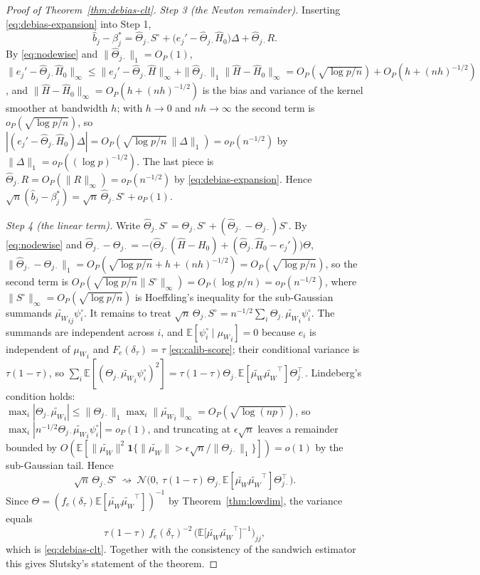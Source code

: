 \documentclass[12pt,a4paper]{article}
\theoremstyle{definition}
\theoremstyle{remark}
\newcommand{\E}{\mathbb{E}}
\newcommand{\cN}{\mathcal{N}}
\newcommand{\ind}[1]{\mathbf{1}\{#1\}}
\newcommand{\muv}{\mu_W}
\begin{document}
\begin{proof}[Proof of Theorem~\ref{thm:debias-clt}]
\emph{Step 3 (the Newton remainder).} Inserting \eqref{eq:debias-expansion} into Step 1,
\[
\hat b_j-\beta^*_j
=\hat\Theta_{j\cdot}S^\circ+\big(e_j'-\hat\Theta_{j\cdot}\hat H_0\big)\Delta
+\hat\Theta_{j\cdot}R .
\]
By \eqref{eq:nodewise} and $\|\hat\Theta_{j\cdot}\|_1=O_P(1)$,
$\|e_j'-\hat\Theta_{j\cdot}\hat H_0\|_\infty\le\|e_j'-\hat\Theta_{j\cdot}\hat H\|_\infty
+\|\hat\Theta_{j\cdot}\|_1\|\hat H-\hat H_0\|_\infty
=O_P(\sqrt{\log p/n})+O_P(h+(nh)^{-1/2})$, and
$\|\hat H-\hat H_0\|_\infty=O_P(h+(nh)^{-1/2})$ is the bias and variance of the kernel
smoother at bandwidth $h$; with $h\to0$ and $nh\to\infty$ the second term is
$o_P(\sqrt{\log p/n})$, so
$|(e_j'-\hat\Theta_{j\cdot}\hat H_0)\Delta|=O_P(\sqrt{\log p/n}\,\|\Delta\|_1)
=o_P(n^{-1/2})$ by $\|\Delta\|_1=o_P((\log p)^{-1/2})$. The last piece is
$\hat\Theta_{j\cdot}R=O_P(\|R\|_\infty)=o_P(n^{-1/2})$ by \eqref{eq:debias-expansion}.
Hence
$\sqrt n(\hat b_j-\beta^*_j)=\sqrt n\,\hat\Theta_{j\cdot}S^\circ+o_P(1)$.

\emph{Step 4 (the linear term).} Write
$\hat\Theta_{j\cdot}S^\circ=\Theta_{j\cdot}S^\circ+(\hat\Theta_{j\cdot}-\Theta_{j\cdot})S^\circ$.
By \eqref{eq:nodewise} and $\hat\Theta_{j\cdot}-\Theta_{j\cdot}
=-\big(\hat\Theta_{j\cdot}(\hat H-H_0)+(\hat\Theta_{j\cdot}\hat H_0-e_j')\big)\Theta$,
$\|\hat\Theta_{j\cdot}-\Theta_{j\cdot}\|_1=O_P(\sqrt{\log p/n}+h+(nh)^{-1/2})
=O_P(\sqrt{\log p/n})$, so the second term is
$O_P(\sqrt{\log p/n}\|S^\circ\|_\infty)=O_P(\log p/n)=o_P(n^{-1/2})$, where
$\|S^\circ\|_\infty=O_P(\sqrt{\log p/n})$ is Hoeffding's inequality for the sub-Gaussian
summands ${\tilde{\muv}}_{ij}\psi_i^\circ$. It remains to treat
$\sqrt n\,\Theta_{j\cdot}S^\circ=n^{-1/2}\sum_i\Theta_{j\cdot}{\tilde{\muv}}_i\psi_i^\circ$.
The summands are independent across $i$, and
$\E[\psi_i^\circ\mid{\muv}_i]=0$ because $e_i$ is independent of ${\muv}_i$ and
$F_e(\delta_\tau)=\tau$ \eqref{eq:calib-score}; their conditional variance is
$\tau(1-\tau)$, so
$\sum_i\E[(\Theta_{j\cdot}{\tilde{\muv}}_i\psi_i^\circ)^2]
=\tau(1-\tau)\Theta_{j\cdot}\E[\tilde{\muv}{\tilde{\muv}}^\top]\Theta_{j\cdot}^\top$.
Lindeberg's condition holds: $\max_i|\Theta_{j\cdot}{\tilde{\muv}}_i|\le\|\Theta_{j\cdot}\|_1
\max_i\|{\tilde{\muv}}_i\|_\infty=O_P(\sqrt{\log(np)})$, so
$\max_i|n^{-1/2}\Theta_{j\cdot}{\tilde{\muv}}_i\psi_i^\circ|=o_P(1)$, and truncating at
$\epsilon\sqrt n$ leaves a remainder bounded by
$O(\E[\|\tilde{\muv}\|^2\ind{\|\tilde{\muv}\|>\epsilon\sqrt n/\|\Theta_{j\cdot}\|_1}])=o(1)$
by the sub-Gaussian tail. Hence
\[
\sqrt n\,\Theta_{j\cdot}S^\circ\ \rightsquigarrow\
\cN\Big(0,\ \tau(1-\tau)\,\Theta_{j\cdot}\E[\tilde{\muv}{\tilde{\muv}}^\top]\Theta_{j\cdot}^\top\Big).
\]
Since $\Theta=(f_e(\delta_\tau)\E[{\tilde{\muv}}{\tilde{\muv}}^\top])^{-1}$ by
Theorem~\ref{thm:lowdim}, the variance equals
\[
\tau(1-\tau)\,f_e(\delta_\tau)^{-2}\,
\Big(\E\big[{\tilde{\muv}}{\tilde{\muv}}^\top\big]^{-1}\Big)_{jj},
\]
which is \eqref{eq:debias-clt}. Together with the consistency of the sandwich estimator this
gives Slutsky's statement of the theorem.
\end{proof}
\end{document}
